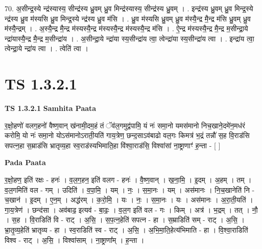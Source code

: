 \documentclass[17pt]{extarticle}
\begin{document}
70. अ॒सीन्द्र॒स्ये न्द्र॑स्यास्य॒ सीन्द्र॑स्य ध्रु॒वम् ध्रु॒व मिन्द्र॑स्यास्य॒ सीन्द्र॑स्य ध्रु॒वम् । . इन्द्र॑स्य ध्रु॒वम् ध्रु॒व मिन्द्र॒स्ये न्द्र॑स्य ध्रु॒व म॑स्यसि ध्रु॒व मिन्द्र॒स्ये न्द्र॑स्य ध्रु॒व म॑सि । . ध्रु॒व म॑स्यसि ध्रु॒वम् ध्रु॒व म॑स्यै॒न्द्र मै॒न्द्र म॑सि ध्रु॒वम् ध्रु॒व म॑स्यै॒न्द्रम् । . अ॒स्यै॒न्द्र मै॒न्द्र म॑स्यस्यै॒न्द्र म॑स्यस्यै॒न्द्र म॑स्यस्यै॒न्द्र म॑सि । . ऐ॒न्द्र म॑स्यस्यै॒न्द्र मै॒न्द्र म॒सीन्द्रा॒ये न्द्रा॑यास्यै॒न्द्र मै॒न्द्र म॒सीन्द्रा॑य । . अ॒सीन्द्रा॒ये न्द्रा॑या स्य॒सीन्द्रा॑य त्वा॒ त्वेन्द्रा॑या स्य॒सीन्द्रा॑य त्वा । . इन्द्रा॑य त्वा॒ त्वेन्द्रा॒ये न्द्रा॑य त्वा । . त्वेति॑ त्वा । \newline
\pagebreak
{}

\section{ TS 1.3.2.1 }

\textbf{TS 1.3.2.1 } \newline
\textbf{Samhita Paata} \newline

र॒क्षो॒हणो॑ वलग॒हनो॑ वैष्ण॒वान् ख॑नामी॒दम॒हं तं ॅव॑ल॒गमुद्व॑पामि॒ यं नः॑ समा॒नो यमस॑मानो निच॒खाने॒दमे॑न॒मध॑रं करोमि॒ यो नः॑ समा॒नो योऽस॑मानोऽराती॒यति॑ गाय॒त्रेण॒ छन्द॒साऽव॑बाढो वल॒गः किमत्र॑ भ॒द्रं तन्नौ॑ स॒ह वि॒राड॑सि सपत्न॒हा स॒म्राड॑सि भ्रातृव्य॒हा स्व॒राड॑स्यभिमाति॒हा वि॑श्वा॒राड॑सि॒ विश्वा॑सां ना॒ष्ट्राणाꣳ॑ ह॒न्ता - [ ] \newline

\textbf{Pada Paata} \newline

र॒क्षो॒हण॒ इति॑ रक्षः - हनः॑ । व॒ल॒ग॒हन॒ इति॑ वलग - हनः॑ । वै॒ष्ण॒वान् । ख॒ना॒मि॒ । इ॒दम् । अ॒हम् । तम् । व॒ल॒गमिति॑ वल - गम् । उदिति॑ । व॒पा॒मि॒ । यम् । नः॒ । स॒मा॒नः । यम् । अस॑मानः । नि॒च॒खानेति॑ नि - च॒खान॑ । इ॒दम् । ए॒न॒म् । अद्ध॑रम् । क॒रो॒मि॒ । यः । नः॒ । स॒मा॒नः । यः । अस॑मानः । अ॒रा॒ती॒यति॑ । गा॒य॒त्रेण॑ । छन्द॑सा । अव॑बाढ॒ इत्यव॑ - बा॒ढः॒ । व॒ल॒ग इति॑ वल - गः । किम् । अत्र॑ । भ॒द्रम् । तत् । नौ॒ । स॒ह । वि॒राडिति॑ वि - राट् । अ॒सि॒ । स॒प॒त्न॒हेति॑ सपत्न - हा । स॒म्राडिति॑ सम् - राट् । अ॒सि॒ । भ्रा॒तृ॒व्य॒हेति॑ भ्रातृव्य - हा । स्व॒राडिति॑ स्व - राट् । अ॒सि॒ । अ॒भि॒मा॒ति॒हेत्य॑भिमाति - हा । वि॒श्वा॒राडिति॑ विश्व - राट् । अ॒सि॒ । विश्वा॑साम् । ना॒ष्ट्राणा᳚म् । ह॒न्ता ।  \newline
\end{document}
